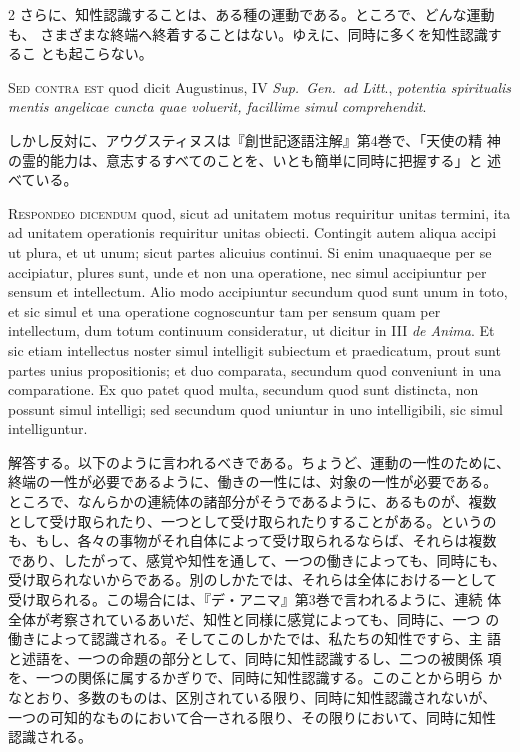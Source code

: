 \documentclass[paper=a4paper,fontsize=10pt,jafontsize=9pt,titlepage]{jlreq}
\begin{document}
\begin{paracol}{2}
さらに、知性認識することは、ある種の運動である。ところで、どんな運動も、
さまざまな終端へ終着することはない。ゆえに、同時に多くを知性認識するこ
とも起こらない。

\switchcolumn*

{\scshape Sed contra est} quod dicit Augustinus, IV
{\itshape Sup.~Gen.~ad Litt}., {\itshape potentia spiritualis mentis angelicae cuncta quae
voluerit, facillime simul comprehendit}.

\switchcolumn

しかし反対に、アウグスティヌスは『創世記逐語注解』第4巻で、「天使の精
神の霊的能力は、意志するすべてのことを、いとも簡単に同時に把握する」と
述べている。

\switchcolumn*

{\scshape Respondeo dicendum} quod, sicut ad unitatem
motus requiritur unitas termini, ita ad unitatem operationis requiritur
unitas obiecti. Contingit autem aliqua accipi ut plura, et ut unum;
sicut partes alicuius continui. Si enim unaquaeque per se accipiatur,
plures sunt, unde et non una operatione, nec simul accipiuntur per
sensum et intellectum. Alio modo accipiuntur secundum quod sunt unum in
toto, et sic simul et una operatione cognoscuntur tam per sensum quam
per intellectum, dum totum continuum consideratur, ut dicitur in III {\itshape de
Anima}. Et sic etiam intellectus noster simul intelligit subiectum et
praedicatum, prout sunt partes unius propositionis; et duo comparata,
secundum quod conveniunt in una comparatione. 
Ex quo patet quod multa,
secundum quod sunt distincta, non possunt simul intelligi; sed secundum
quod uniuntur in uno intelligibili, sic simul intelliguntur.

\switchcolumn

解答する。以下のように言われるべきである。ちょうど、運動の一性のために、
終端の一性が必要であるように、働きの一性には、対象の一性が必要である。
ところで、なんらかの連続体の諸部分がそうであるように、あるものが、複数
として受け取られたり、一つとして受け取られたりすることがある。というの
も、もし、各々の事物がそれ自体によって受け取られるならば、それらは複数
であり、したがって、感覚や知性を通して、一つの働きによっても、同時にも、
受け取られないからである。別のしかたでは、それらは全体における一として
受け取られる。この場合には、『デ・アニマ』第3巻で言われるように、連続
体全体が考察されているあいだ、知性と同様に感覚によっても、同時に、一つ
の働きによって認識される。そしてこのしかたでは、私たちの知性ですら、主
語と述語を、一つの命題の部分として、同時に知性認識するし、二つの被関係
項を、一つの関係に属するかぎりで、同時に知性認識する。このことから明ら
かなとおり、多数のものは、区別されている限り、同時に知性認識されないが、
一つの可知的なものにおいて合一される限り、その限りにおいて、同時に知性
認識される。


\end{paracol}
\end{document}
